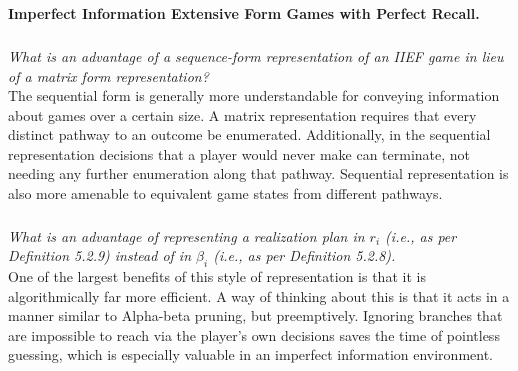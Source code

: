 \documentclass[12pt]{amsart}
\begin{document}
\subsection{}
\textbf{Imperfect Information Extensive Form Games with Perfect Recall.}

\subsubsection{}
\textit{What is an advantage of a sequence-form representation of an IIEF game in lieu of a
	matrix form representation?} \\
	
	The sequential form is generally more understandable for conveying information about games over a certain size.
	A matrix representation requires that every distinct pathway to an outcome be enumerated. 
	Additionally, in the sequential representation decisions that a player would never make can terminate, 
	not needing any further enumeration along that pathway. 
	Sequential representation is also more amenable to equivalent game states from different pathways.

\subsubsection{}
\textit{What is an advantage of representing a realization plan in $r_i$ (i.e., as per Definition 5.2.9)
	instead of in $\beta_i$ (i.e., as per Definition 5.2.8).} \\

	One of the largest benefits of this style of representation is that it is algorithmically far more efficient.
	A way of thinking about this is that it acts in a manner similar to Alpha-beta pruning, but preemptively.
	Ignoring branches that are impossible to reach via the player's own decisions saves the time of pointless
	guessing, which is especially valuable in an imperfect information environment.
\end{document}
